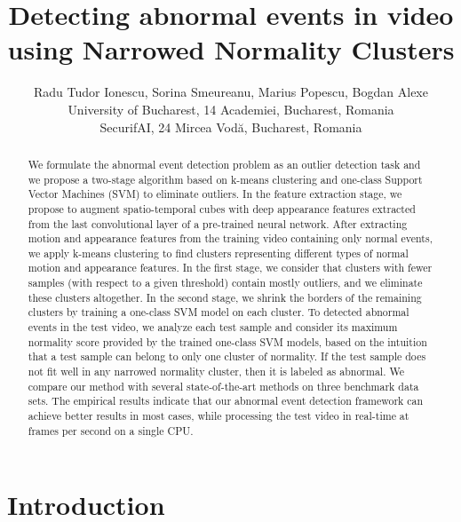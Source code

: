 \documentclass[10pt,twocolumn,letterpaper]{article}
\begin{document}
\title{Detecting abnormal events in video using Narrowed Normality Clusters}

\author{Radu Tudor Ionescu, Sorina Smeureanu, Marius Popescu, Bogdan Alexe\\
University of Bucharest, 14 Academiei, Bucharest, Romania\\
SecurifAI, 24 Mircea Vod\u{a}, Bucharest, Romania\vspace*{-0.2cm}
}


\maketitle
\ifwacvfinal\thispagestyle{empty}\fi

\begin{abstract}
We formulate the abnormal event detection problem as an outlier detection task and we propose a two-stage algorithm based on k-means clustering and one-class Support Vector Machines (SVM) to eliminate outliers. In the feature extraction stage, we propose to augment spatio-temporal cubes with deep appearance features extracted from the last convolutional layer of a pre-trained neural network. After extracting motion and appearance features from the training video containing only normal events, we apply k-means clustering to find clusters representing different types of normal motion and appearance features. In the first stage, we consider that clusters with fewer samples (with respect to a given threshold) contain mostly outliers, and we eliminate these clusters altogether. In the second stage, we shrink the borders of the remaining clusters by training a one-class SVM model on each cluster. To detected abnormal events in the test video, we analyze each test sample and consider its maximum normality score provided by the trained one-class SVM models, based on the intuition that a test sample can belong to only one cluster of normality. If the test sample does not fit well in any narrowed normality cluster, then it is labeled as abnormal. We compare our method with several state-of-the-art methods on three benchmark data sets. The empirical results indicate that our abnormal event detection framework can achieve better results in most cases, while processing the test video in real-time at  frames per second on a single CPU.
\end{abstract}

\vspace*{-0.3cm}
\section{Introduction}
\vspace*{-0.1cm}
\end{document}
